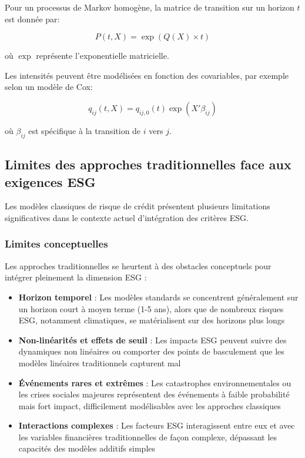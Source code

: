 Pour un processus de Markov homogène, la matrice de transition sur un horizon $t$ est donnée par:

\begin{equation}
P(t,X) = \exp(Q(X) \times t)
\end{equation}

où $\exp$ représente l'exponentielle matricielle.

Les intensités peuvent être modélisées en fonction des covariables, par exemple selon un modèle de Cox:

\begin{equation}
q_{ij}(t,X) = q_{ij,0}(t) \exp(X'\beta_{ij})
\end{equation}

où $\beta_{ij}$ est spécifique à la transition de $i$ vers $j$.

\subsection{Limites des approches traditionnelles face aux exigences ESG}

Les modèles classiques de risque de crédit présentent plusieurs limitations significatives dans le contexte actuel d'intégration des critères ESG.

\subsubsection{Limites conceptuelles}

Les approches traditionnelles se heurtent à des obstacles conceptuels pour intégrer pleinement la dimension ESG :

\begin{itemize}
    \item \textbf{Horizon temporel} : Les modèles standards se concentrent généralement sur un horizon court à moyen terme (1-5 ans), alors que de nombreux risques ESG, notamment climatiques, se matérialisent sur des horizons plus longs
    
    \item \textbf{Non-linéarités et effets de seuil} : Les impacts ESG peuvent suivre des dynamiques non linéaires ou comporter des points de basculement que les modèles linéaires traditionnels capturent mal
    
    \item \textbf{Événements rares et extrêmes} : Les catastrophes environnementales ou les crises sociales majeures représentent des événements à faible probabilité mais fort impact, difficilement modélisables avec les approches classiques
    
    \item \textbf{Interactions complexes} : Les facteurs ESG interagissent entre eux et avec les variables financières traditionnelles de façon complexe, dépassant les capacités des modèles additifs simples
\end{itemize}

